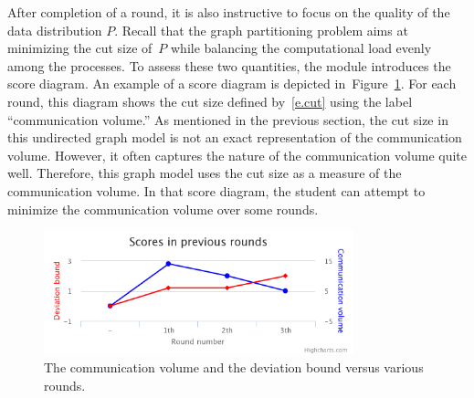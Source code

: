 \documentclass[12pt, twoside,a4paper,toc=bibliography]{scrbook}
\newcommand{\figref}[1]{Figure~\protect\ref{#1}}
\begin{document}
After completion of a round, it is also instructive to focus on the quality of the data
distribution $P$. Recall that the graph partitioning problem aims at minimizing the cut
size of~$P$ while balancing the computational load evenly among the processes. To assess
these two quantities, the module introduces the score diagram. An example of a score
diagram is depicted in~\figref{f.score}. For each round, this diagram shows the cut size
defined by~\eqref{e.cut} using the label ``communication volume.'' As mentioned in the
previous section, the cut size in this undirected graph model is not an exact
representation of the communication volume. However, it often captures the nature of the
communication volume quite well. Therefore, this graph model uses the cut size as a
measure of the communication volume. In that score diagram, the student can attempt to minimize the communication volume over some rounds.

\begin{figure}
\centering
\includegraphics[width=0.8\textwidth]{chart}
\caption{The communication volume and the deviation bound versus various rounds.}
\label{f.score}
\end{figure}
\end{document}
